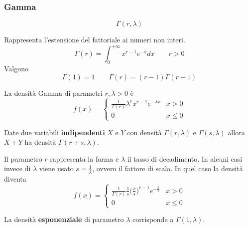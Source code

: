 \subsubsection{Gamma}
\begin{equation}
	\Gamma(r, \lambda)
\end{equation}
\begin{definition}
	Rappresenta l'estensione del fattoriale ai numeri non interi.
	\begin{equation}
		\Gamma(r) = \int_{0}^{+\infty} x^{r-1}e^{-x}dx \quad\quad r>0
	\end{equation}
	Valgono
	\begin{equation*}
		\Gamma(1) = 1 \quad\quad \Gamma(r) = (r-1)\Gamma(r-1)
	\end{equation*}
\end{definition}

\begin{definition}
	La densità Gamma di parametri $r, \lambda > 0$ è
	\begin{equation}
		f(x) = \begin{cases}
			\frac{1}{\Gamma(r)}\lambda^r x^{r-1}e^{-\lambda x} & x >0\\
			0 & x \leq 0
		\end{cases}
	\end{equation}
\end{definition}

\begin{proposition}
	Date due variabili \textbf{indipendenti} $X$ e $Y$ con densità $\Gamma(r, \lambda)$ e $\Gamma(s, \lambda)$ allora $X+Y$ ha densità $\Gamma(r+s, \lambda)$.
\end{proposition}

\begin{observation}[Parametri]
	Il parametro $r$ rappresenta la forma e $\lambda$ il tasso di decadimento. In alcuni casi invece di $\lambda$ viene usato $s=\frac{1}{\lambda}$, ovvero il fattore di scala. In quel caso la densità diventa
	\begin{equation*}
		f(x) = \begin{cases}
			\frac{1}{\Gamma(r)} \frac{1}{s} \bigg(\frac{x}{s}\bigg)^{r-1} e^{-\frac{x}{s}} & x >0\\
			0 & x \leq 0
		\end{cases}
	\end{equation*}
\end{observation}

\begin{observation}
	La densità \textbf{esponenziale} di parametro $\lambda$ corrisponde a $\Gamma(1, \lambda)$.
\end{observation}

